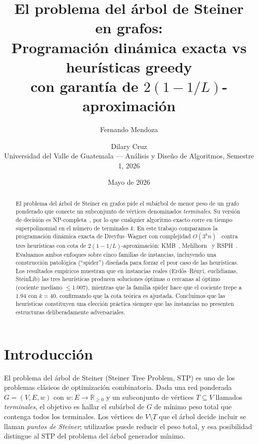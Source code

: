 \documentclass[11pt]{article}
\title{El problema del \'arbol de Steiner en grafos:\\
Programaci\'on din\'amica exacta vs heur\'isticas greedy\\
con garant\'ia de $2(1-1/L)$-aproximaci\'on}
\author{Fernando Mendoza \and Dilary Cruz \\
{\small Universidad del Valle de Guatemala ---
An\'alisis y Dise\~no de Algoritmos, Semestre 1, 2026}}
\date{Mayo de 2026}
\begin{document}
\maketitle

\begin{abstract}
El problema del \'arbol de Steiner en grafos pide el sub\'arbol de menor
peso de un grafo ponderado que conecte un subconjunto de v\'ertices
denominados \emph{terminales}.  Su versi\'on de decisi\'on es
NP-completa~\cite{Karp1972}, por lo que cualquier algoritmo exacto corre en
tiempo superpolinomial en el n\'umero de terminales $k$.  En este trabajo
comparamos la programaci\'on din\'amica exacta de Dreyfus--Wagner con
complejidad $O(3^k n)$~\cite{DreyfusWagner1971} contra tres heur\'isticas
con cota de $2(1-1/L)$-aproximaci\'on: KMB~\cite{KouMarkowskyBerman1981},
Mehlhorn~\cite{Mehlhorn1988} y RSPH~\cite{TakahashiMatsuyama1980}.
Evaluamos ambos enfoques sobre cinco familias de instancias, incluyendo una
construcci\'on patol\'ogica (``spider'') dise\~nada para forzar el peor caso
de las heur\'isticas.  Los resultados emp\'iricos muestran que en instancias
reales (Erd\H{o}s--R\'enyi, euclidianas, SteinLib) las tres heur\'isticas
producen soluciones \'optimas o cercanas al \'optimo (cociente mediano $\le 1.007$),
mientras que la familia spider hace que el cociente trepe a $1.94$ con $k=40$,
confirmando que la cota te\'orica es ajustada.  Concluimos que las heur\'isticas
constituyen una elecci\'on pr\'actica siempre que las instancias no presenten
estructuras deliberadamente adversariales.
\end{abstract}

\section{Introducci\'on}\label{sec:intro}

El problema del \'arbol de Steiner (Steiner Tree Problem, STP) es uno de
los problemas cl\'asicos de optimizaci\'on combinatoria.  Dada una red
ponderada $G=(V,E,w)$ con $w:E\to\mathbb{R}_{\ge 0}$ y un subconjunto de
v\'ertices $T\subseteq V$ llamados \emph{terminales}, el objetivo es hallar
el sub\'arbol de $G$ de m\'inimo peso total que contenga todos los terminales.
Los v\'ertices de $V\setminus T$ que el \'arbol decide incluir se llaman
\emph{puntos de Steiner}; utilizarlos puede reducir el peso total, y esa
posibilidad distingue al STP del problema del \'arbol generador m\'inimo.
\end{document}
